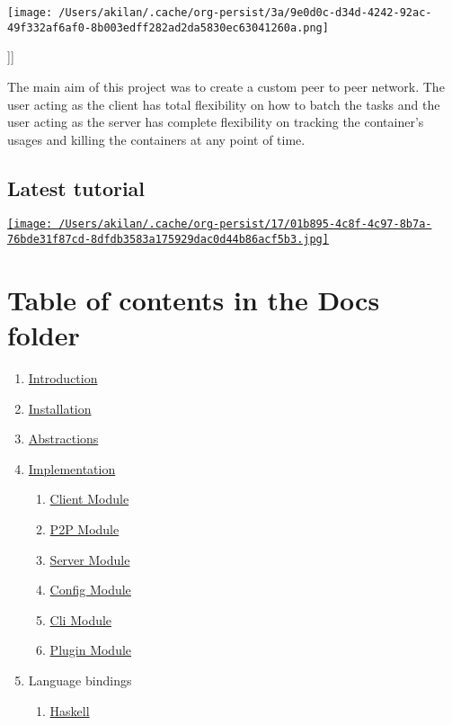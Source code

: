 \documentclass[11pt]{article}
\author{Akilan}
\date{\today}
\title{}
\begin{document}
\tableofcontents

\begin{center}
\texttt{[image: /Users/akilan/.cache/org-persist/3a/9e0d0c-d34d-4242-92ac-49f332af6af0-8b003edff282ad2da5830ec63041260a.png]}
\end{center}]]

The main aim of this project was to create a custom peer to peer
network. The user acting as the client has total flexibility on how to
batch the tasks and the user acting as the server has complete
flexibility on tracking the container's usages and killing the
containers at any point of time.

\subsection{Latest tutorial}
\label{sec:org9129ee1}
\href{https://www.youtube.com/watch?v=OMwCpedu5cs\%22}{\texttt{[image: /Users/akilan/.cache/org-persist/17/01b895-4c8f-4c97-8b7a-76bde31f87cd-8dfdb3583a175929dac0d44b86acf5b3.jpg]}}

\section{Table of contents in the Docs folder}
\label{sec:org881a67e}
\begin{enumerate}
\item \href{Docs/Introduction.org}{Introduction}
\item \href{Docs/Installation.org}{Installation}
\item \href{Docs/Abstractions.org}{Abstractions}
\item \href{Docs/Implementation.org}{Implementation}
\begin{enumerate}
\item \href{Docs/ClientImplementation.org}{Client Module}
\item \href{Docs/P2PImplementation.org}{P2P Module}
\item \href{Docs/ServerImplementation.org}{Server Module}
\item \href{Docs/ConfigImplementation.org}{Config Module}
\item \href{Docs/CliImplementation.org}{Cli Module}
\item \href{Docs/PluginImplementation.org}{Plugin Module}
\end{enumerate}
\item Language bindings
\begin{enumerate}
\item \href{Docs/haskell/}{Haskell}
\end{enumerate}
\end{enumerate}
\end{document}
